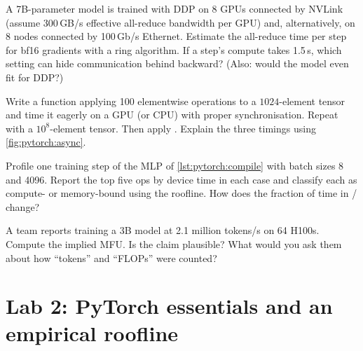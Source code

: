 \begin{exercise}
A 7B-parameter model is trained with DDP on 8 GPUs connected by NVLink (assume 300\,GB/s effective
all-reduce bandwidth per GPU) and, alternatively, on 8 nodes connected by 100\,Gb/s Ethernet. Estimate the
all-reduce time per step for bf16 gradients with a ring algorithm. If a step's compute takes 1.5\,s, which
setting can hide communication behind backward? (Also: would the model even fit for DDP?)
\end{exercise}

\begin{exercise}
Write a function applying 100 elementwise operations to a $1024$-element tensor and time it eagerly on a
GPU (or CPU) with proper synchronisation. Repeat with a $10^8$-element tensor. Then apply
. Explain the three timings using \cref{fig:pytorch:async}.
\end{exercise}

\begin{exercise}[Profiling]
Profile one training step of the MLP of \cref{lst:pytorch:compile} with batch sizes 8 and 4096. Report the
top five ops by device time in each case and classify each as compute- or memory-bound using the roofline.
How does the fraction of time in / change?
\end{exercise}

\begin{exercise}
A team reports training a 3B model at 2.1 million tokens/s on 64 H100s. Compute the implied MFU. Is the claim
plausible? What would you ask them about how ``tokens'' and ``FLOPs'' were counted?
\end{exercise}

\section{Lab 2: PyTorch essentials and an empirical roofline}\label{sec:pytorch:lab}

